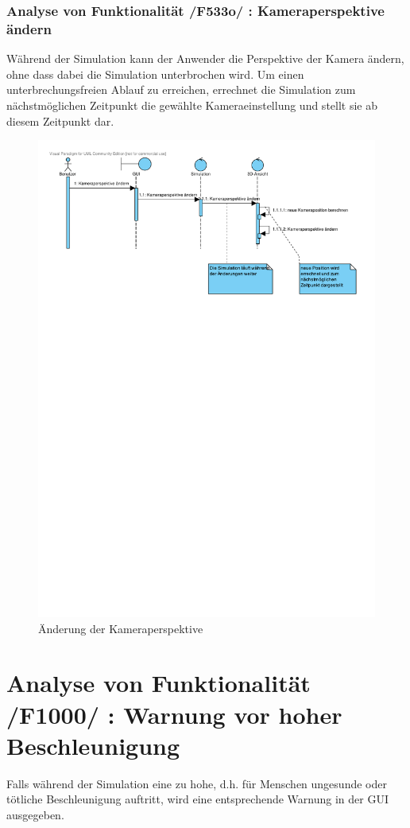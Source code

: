 \newpage

\subsubsection{Analyse von Funktionalität /F533o/ :  Kameraperspektive ändern}
Während der Simulation kann der Anwender die Perspektive der Kamera ändern, ohne dass dabei die Simulation unterbrochen wird. Um einen unterbrechungsfreien Ablauf zu erreichen, errechnet die Simulation zum nächstmöglichen Zeitpunkt die gewählte Kameraeinstellung und stellt sie ab diesem Zeitpunkt dar. 
\begin{figure}[h!]
\includegraphics[viewport = 0 17.5cm 25cm 30cm,width=\linewidth]{bilder/Kameraperspektive.pdf}
\caption{Änderung der Kameraperspektive}
\label{Kameraperspektive}
\end{figure}
\section{Analyse von Funktionalität /F1000/ :  Warnung vor hoher Beschleunigung}
Falls während der Simulation eine zu hohe, d.h. für Menschen ungesunde oder tötliche Beschleunigung auftritt, wird eine entsprechende Warnung in der GUI ausgegeben.

